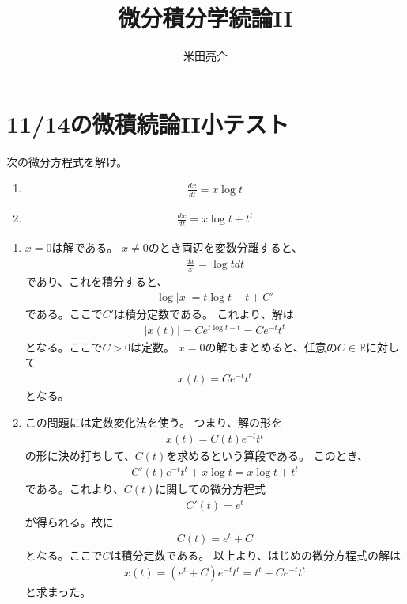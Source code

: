 \documentclass{jsarticle}
\begin{document}
\title{微分積分学続論II}
\author{米田亮介}
\maketitle
\section{11/14の微積続論II小テスト}
\begin{shaded}
次の微分方程式を解け。
\begin{enumerate}
\item 
\begin{align}
\frac{dx}{dt}=x\log t
\end{align}
\item 
\begin{align}
\frac{dx}{dt}=x\log t+t^{t}
\end{align}
\end{enumerate}
\end{shaded}
\begin{enumerate}
\item 
$x=0$は解である。
$x\ne 0$のとき両辺を変数分離すると、
\begin{align}
\frac{dx}{x}=\log tdt
\end{align}
であり、これを積分すると、
\begin{align}
\log |x|=t\log t-t+C'
\end{align}
である。ここで$C'$は積分定数である。
これより、解は
\begin{align}
|x(t)|=Ce^{t\log t-t}=Ce^{-t}t^{t}
\end{align}
となる。ここで$C>0$は定数。
$x=0$の解もまとめると、任意の$C\in\mathbb{R}$に対して
\begin{align}
x(t)=Ce^{-t}t^{t}
\end{align}
となる。
\item
この問題には定数変化法を使う。
つまり、解の形を
\begin{align}
x(t)=C(t)e^{-t}t^{t}
\end{align}
の形に決め打ちして、$C(t)$を求めるという算段である。
このとき、
\begin{align}
C'(t)e^{-t}t^{t}+x\log t=x\log t+t^{t}
\end{align}
である。これより、$C(t)$に関しての微分方程式
\begin{align}
C'(t)=e^{t}
\end{align}
が得られる。故に
\begin{align}
C(t)=e^{t}+C
\end{align}
となる。ここで$C$は積分定数である。
以上より、はじめの微分方程式の解は
\begin{align}
x(t)=(e^{t}+C)e^{-t}t^{t}=t^{t}+Ce^{-t}t^{t}
\end{align}
と求まった。
\end{enumerate}
\end{document}
